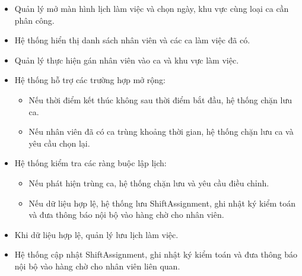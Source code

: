 \begin{itemize}
    \item Quản lý mở màn hình lịch làm việc và chọn ngày, khu vực cùng loại ca cần phân công.
    
    \item Hệ thống hiển thị danh sách nhân viên và các ca làm việc đã có.
    
    \item Quản lý thực hiện gán nhân viên vào ca và khu vực làm việc.
    
    \item Hệ thống hỗ trợ các trường hợp mở rộng:
    \begin{itemize}
        \item Nếu thời điểm kết thúc không sau thời điểm bắt đầu, hệ thống chặn lưu ca.
        \item Nếu nhân viên đã có ca trùng khoảng thời gian, hệ thống chặn lưu ca và yêu cầu chọn lại.
    \end{itemize}
    
    \item Hệ thống kiểm tra các ràng buộc lập lịch:
    \begin{itemize}
        \item Nếu phát hiện trùng ca, hệ thống chặn lưu và yêu cầu điều chỉnh.
        \item Nếu dữ liệu hợp lệ, hệ thống lưu \textsf{ShiftAssignment}, ghi nhật ký kiểm toán và đưa thông báo nội bộ vào hàng chờ cho nhân viên.
    \end{itemize}
    
    \item Khi dữ liệu hợp lệ, quản lý lưu lịch làm việc.
    
    \item Hệ thống cập nhật \textsf{ShiftAssignment}, ghi nhật ký kiểm toán và đưa thông báo nội bộ vào hàng chờ cho nhân viên liên quan.
\end{itemize}
\pagebreak
